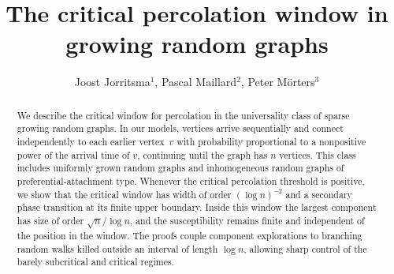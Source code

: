 \documentclass[a4paper, a4wide, 10pt, reqno]{amsart}
\theoremstyle{plain}
\theoremstyle{definition}
\numberwithin{equation}{section}
\begin{document}
\title{The critical percolation window in growing random graphs}
\author[J.\ Jorritsma, P.\ Maillard, P.\ M\"orters]{Joost Jorritsma$^1$, Pascal Maillard$^2$, Peter M\"orters$^3$}
\address{\hspace{-12pt}$^1$Department of Statistics, University of Oxford, United Kingdom. 
\newline 
$^2$Institut de Mathématique de Toulouse, 
Université de Toulouse, France, and 
\newline 
\phantom{$^2$}Institut Universitaire de France.
\newline
$^3$Department Mathematik/Informatik, Universit\"at zu K\"oln, Germany.}

\begin{abstract}
We describe the critical window for percolation in the universality class of sparse growing random graphs. In 
our models, vertices arrive sequentially and connect independently to each earlier vertex~$v$ with probability proportional to a nonpositive
power of the arrival time of $v$, continuing until the graph has $n$ vertices. This class includes uniformly grown random graphs and inhomogeneous random graphs of preferential-attachment type. 
Whenever the critical percolation threshold is positive, we show that the critical 
window has width of order $(\log n)^{-2}$ 
and a secondary phase transition at its finite upper boundary.
Inside this window the largest component has size of order $\sqrt{n}/\log n$, and the susceptibility remains finite and independent of the  position in the window. The proofs couple component explorations to branching random walks killed outside an interval of length $\log n$, allowing sharp control of the barely subcritical and critical regimes.
\end{abstract}


\maketitle

\vspace{-2em}
\end{document}
